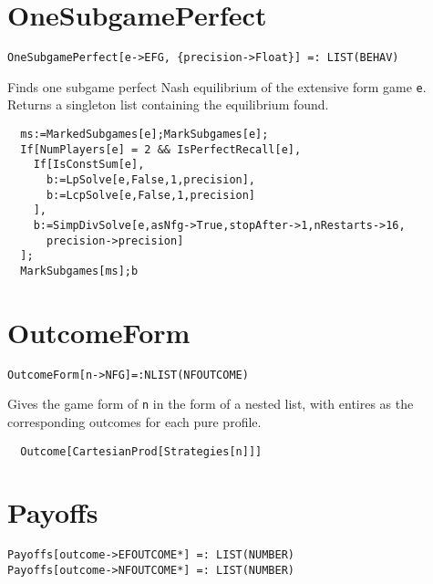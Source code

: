 
\section*{OneSubgamePerfect}\label{ExtOneSubgamePerfect}
\begin{verbatim}
OneSubgamePerfect[e->EFG, {precision->Float}] =: LIST(BEHAV) 
\end{verbatim}

\noindent
Finds one subgame perfect Nash equilibrium of the extensive form
game \verb+e+.  Returns a singleton list containing the equilibrium
found.

\udfbody
\begin{verbatim}
  ms:=MarkedSubgames[e];MarkSubgames[e];
  If[NumPlayers[e] = 2 && IsPerfectRecall[e],
    If[IsConstSum[e],
      b:=LpSolve[e,False,1,precision],
      b:=LcpSolve[e,False,1,precision]
    ],
    b:=SimpDivSolve[e,asNfg->True,stopAfter->1,nRestarts->16,
      precision->precision]
  ];
  MarkSubgames[ms];b
\end{verbatim} 


\section*{OutcomeForm}\label{ExtOutcomeForm}
\begin{verbatim}
OutcomeForm[n->NFG]=:NLIST(NFOUTCOME)
\end{verbatim}

\noindent
Gives the game form of \verb+n+ in the form of a nested list, with
entires as the corresponding outcomes for each pure profile. 

\udfbody
\begin{verbatim}
  Outcome[CartesianProd[Strategies[n]]]
\end{verbatim} 


\section*{Payoffs}\label{ExtPayoffs}
\begin{verbatim}
Payoffs[outcome->EFOUTCOME*] =: LIST(NUMBER) 
Payoffs[outcome->NFOUTCOME*] =: LIST(NUMBER) 
\end{verbatim}

